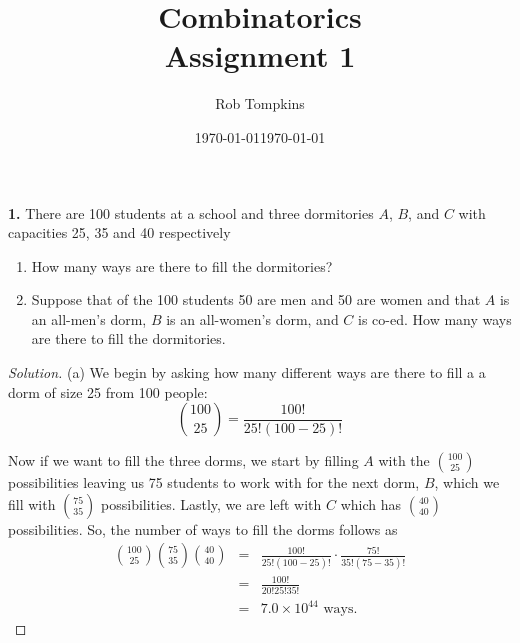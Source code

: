 \documentclass[12pt]{amsart}
\title{Combinatorics\\Assignment 1}
\author{Rob Tompkins}
\date{\today}
\newenvironment{solution}
{\begin{proof}[Solution]}
{\end{proof}}
\begin{document}
    \maketitle
    \date{\today}
    \begin{onehalfspace}
        \noindent\textbf{1.} There are 100 students at a school and three dormitories $A$, $B$, and $C$
        with capacities 25, 35 and 40 respectively
        \begin{enumerate}[label=(\alph*)]
            \item How many ways are there to fill the dormitories?
            \item Suppose that of the 100 students 50 are men and 50 are women and that $A$
                  is an all-men's dorm, $B$ is an all-women's dorm, and $C$ is co-ed. How
                  many ways are there to fill the dormitories.
        \end{enumerate}
        \begin{solution}
            (a) We begin by asking how many different ways are there to fill a a dorm of size 25 from 100 people:
            \begin{displaymath}
                \binom{100}{25} = \frac{100!}{25!(100 - 25)!}
            \end{displaymath}

            Now if we want to fill the three dorms, we start by filling $A$ with the $\binom{100}{25}$ possibilities
            leaving us 75 students to work with for the next dorm, $B$, which we fill with $\binom{75}{35}$
            possibilities. Lastly, we are left with $C$ which has $\binom{40}{40}$ possibilities. So, the number
            of ways to fill the dorms follows as
            \begin{eqnarray*}
                \binom{100}{25}\binom{75}{35}\binom{40}{40} & = & \frac{100!}{25!(100 - 25)!} \cdot \frac{75!}{35!(75 - 35)!} \\
                                                            & = & \frac{100!}{20!25!35!} \\
                                                            & = & 7.0 \times 10^{44} \text{ ways.}
            \end{eqnarray*}


\end{solution}
\end{onehalfspace}
\end{document}
